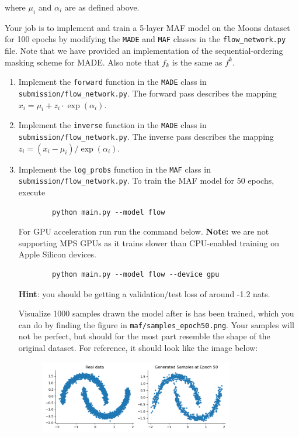 where $\mu_i$ and $\alpha_i$ are as defined above.

Your job is to implement and train a 5-layer MAF model on the Moons dataset for 100 epochs by modifying the \texttt{MADE} 
and \texttt{MAF} classes in the \texttt{flow\_network.py} file. Note that we have provided an implementation of the 
sequential-ordering masking scheme for MADE. Also note that $f_k$ is the same as $f^k$.

\begin{enumerate}[label=(\alph*)]
    \item {} Implement the \texttt{forward} function in the \texttt{MADE} class in \texttt{submission/flow\_network.py}. 
    The forward pass describes the mapping $x_i = \mu_i + z_i \cdot \exp(\alpha_i)$.

    \item {} Implement the \texttt{inverse} function in the \texttt{MADE} class in \texttt{submission/flow\_network.py}. 
    The inverse pass describes the mapping $z_i = (x_i-\mu_i)/ \exp(\alpha_i)$.

    \clearpage
    
    \item {} Implement the \texttt{log\_probs} function in the \texttt{MAF} class in \texttt{submission/flow\_network.py}. 
    To train the MAF model for 50 epochs, execute
    
    \begin{verbatim}
        python main.py --model flow
    \end{verbatim}  

    For GPU acceleration run run the command below. \textbf{Note:} we are not supporting MPS GPUs as it trains slower than CPU-enabled training on Apple Silicon devices.
    \begin{verbatim}
        python main.py --model flow --device gpu
    \end{verbatim}  
    
    \textbf{Hint}: you should be getting a validation/test loss of around -1.2 nats.

    Visualize 1000 samples drawn the model after is has been trained, which you can do by finding the figure 
    in \texttt{maf/samples\_epoch50.png}. Your samples will not be perfect, 
    but should for the most part resemble the shape of the original dataset. For reference, it should
    look like the image below:

    \begin{figure}[h]
        \centering
        \includegraphics[width=0.8\textwidth]{./figures/samples_epoch50}
    \end{figure}
    
\end{enumerate}